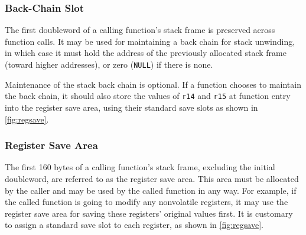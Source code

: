 \documentclass[USenglish,fontsize=11pt,twoside,%
  toc=bib,toc=idx,toc=graduated,numbers=noendperiod,
  bookmarks=true,
  bookmarksnumbered=true,
  bookmarksopen=true,
  bookmarksopenlevel=1,
  breaklinks=true,
  colorlinks=true,
  linkcolor=black,
  pdfpagelayout={TwoPageRight},
  pdfusetitle=true
]{scrreprt}
\newcommand{\STACKSIZE}{160}
\newcommand{\STACKSIZE}{96}
\begin{document}
\subsubsection{Back-Chain Slot}
The first {\ifzseries double\fi}word of a calling function's stack frame
is preserved across function calls.  It may be used for maintaining a back
chain for stack unwinding, in which case it must hold the address of the
previously allocated stack frame (toward higher addresses), or zero
(\texttt{NULL}) if there is none.

Maintenance of the stack back chain is optional.  If a function chooses to
maintain the back chain, it should also store the values of \texttt{r14}
and \texttt{r15} at function entry into the register save area, using
their standard save slots as shown in \cref{fig:regsave}.

\subsubsection{Register Save Area}
The first \STACKSIZE{} bytes of a calling function's stack frame,
excluding the initial {\ifzseries double\fi}word, are referred to as the
register save area.  This area must be allocated by the caller and may be
used by the called function in any way.  For example, if the called
function is going to modify any nonvolatile registers, it may use the
register save area for saving these registers' original values first.  It
is customary to assign a standard save slot to each register, as shown in
\cref{fig:regsave}.
\end{document}
